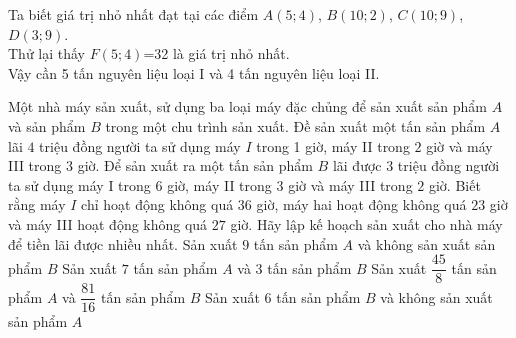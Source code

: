\begin{ex}
{\begin{center}
		\end{center}
		Ta biết giá trị nhỏ nhất đạt tại các điểm $A(5;4)$, $B(10;2)$, $C(10;9)$, $D(3;9)$.\\
		Thử lại thấy $F(5;4)$=32 là giá trị nhỏ nhất.\\
		Vậy cần 5 tấn nguyên liệu loại I và 4 tấn nguyên liệu loại II.
	}
\end{ex}

\begin{ex}%
	Một nhà máy sản xuất, sử dụng ba loại máy đặc chủng để sản xuất sản phẩm $A$ và sản phẩm $B$ trong một chu trình sản xuất. Đề sản xuất một tấn sản phẩm $A$ lãi $4$ triệu đồng người ta sử dụng máy $I$ trong 1 giờ, máy II trong $2$ giờ và máy III trong $3$ giờ. Để sản xuất ra một tấn sản phẩm $B$ lãi được $3$ triệu đồng người ta sử dụng máy I trong $6$ giờ, máy II trong $3$ giờ và máy III trong $2$ giờ. Biết rằng máy $I$ chỉ hoạt động không quá $36$ giờ, máy hai hoạt động không quá $23$ giờ và máy III hoạt động không quá $27$ giờ. Hãy lập kế hoạch sản xuất cho nhà máy để tiền lãi được nhiều nhất. 
	\choice
	{Sản xuất $9$ tấn sản phẩm $A$ và không sản xuất sản phẩm $B$}
	{Sản xuất $7$ tấn sản phẩm $A$ và $3$ tấn sản phẩm $B$}
	{\True Sản xuất $\dfrac{45}{8}$ tấn sản phẩm $A$ và $\dfrac{81}{16}$ tấn sản phẩm $B$}
	{Sản xuất $6$ tấn sản phẩm $B$ và không sản xuất sản phẩm $A$}
\end{ex}
